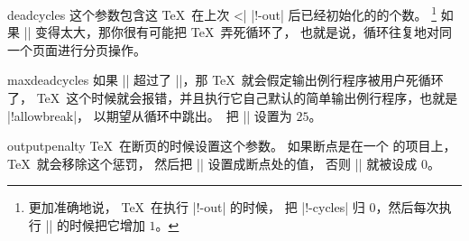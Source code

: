 
\begindesc
\cts deadcycles {}
\explain
这个参数包含这 \TeX\ 在上次 ^^|\shipout| |\ship!-out|
后已经初始化的的个数。
\footnote{更加准确地说， \TeX\ 在执行 |\ship!-out| 的时候，
把 |\dead!-cycles| 归 $0$，然后每次执行 |\output| 的时候把它增加 $1$。}
如果 |\deadcycles| 变得太大，那你很有可能把 \TeX\ 弄死循环了，
也就是说，循环往复地对同一个页面进行分页操作。
\enddesc



\begindesc
\cts maxdeadcycles {}
\explain
如果 |\deadcycles| 超过了 |\maxdeadcycles|，那 \TeX\ 就会假定输出例行程序被用户死循环了，
\TeX\ 这个时候就会报错，并且执行它自己默认的简单输出例行程序，也就是 |\shipout!allowbreak|，
以期望从循环中跳出。\PlainTeX\ 把 |\maxdeadcycles| 设置为 \hbox{$25$}。
\enddesc

%

\begindesc
\cts outputpenalty {}
\explain
\TeX\ 在断页的时候设置这个参数。
如果断点是在一个  的项目上，\TeX\ 就会移除这个惩罚，
然后把 |\outputpenalty| 设置成断点处的值， 否则 |\outputpenalty| 就被设成 \hbox{$0$}。

